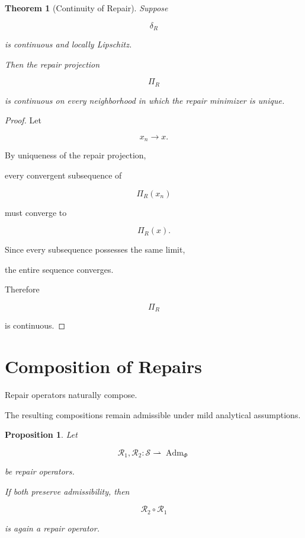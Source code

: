 \documentclass[11pt]{book}
\numberwithin{equation}{chapter}
\theoremstyle{definition}
\theoremstyle{plain}
\newtheorem{theorem}[definition]{Theorem}
\newtheorem{proposition}[definition]{Proposition}
\begin{document}
\begin{theorem}[Continuity of Repair]

Suppose

\[
\delta_R
\]

is continuous and locally Lipschitz.

Then the repair projection

\[
\Pi_R
\]

is continuous on every neighborhood in which the repair minimizer is
unique.

\end{theorem}

\begin{proof}

Let

\[
x_n\rightarrow x.
\]

By uniqueness of the repair projection,

every convergent subsequence of

\[
\Pi_R(x_n)
\]

must converge to

\[
\Pi_R(x).
\]

Since every subsequence possesses the same limit,

the entire sequence converges.

Therefore

\[
\Pi_R
\]

is continuous.

\end{proof}

\section{Composition of Repairs}

Repair operators naturally compose.

The resulting compositions remain admissible under mild analytical
assumptions.

\begin{proposition}

Let

\[
\mathcal R_1,
\mathcal R_2
:
\mathcal S
\rightharpoonup
\operatorname{Adm}_{\Phi}
\]

be repair operators.

If both preserve admissibility, then

\[
\mathcal R_2
\circ
\mathcal R_1
\]

is again a repair operator.

\end{proposition}
\end{document}
